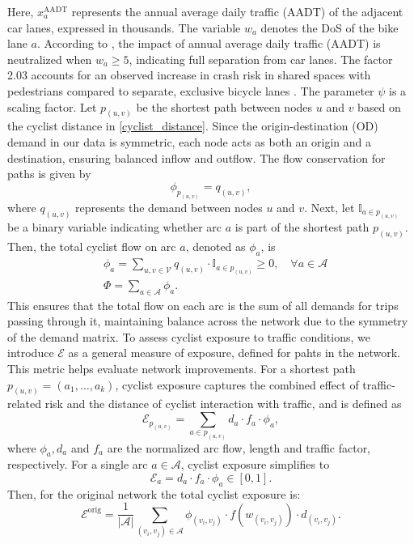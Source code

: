 \documentclass[lettersize,journal]{IEEEtran}
\begin{document}
Here, $x^{\text{AADT}}_{a}$ represents the annual average daily traffic (AADT) of the adjacent car lanes, expressed in thousands. The variable $w_a$ denotes the DoS of the bike lane $a$. According to \cite{cyclerap2024}, the impact of annual average daily traffic (AADT) is neutralized when $w_a \geq 5$, indicating full separation from car lanes. The factor 2.03 accounts for an observed increase in crash risk in shared spaces with pedestrians compared to separate, exclusive bicycle lanes \cite{mesimaki2021near}. The parameter $\psi$ is a scaling factor.  
Let $p_{(u,v)}$ be the shortest path between nodes $u$ and $v$ based on the cyclist distance in \eqref{cyclist_distance}. Since the origin-destination (OD) demand in our data is symmetric, each node acts as both an origin and a destination, ensuring balanced inflow and outflow. The flow conservation for paths is given by
\begin{equation}
\label{eq_shortest_path}
    \phi_{p_{(u,v)}} = q_{(u,v)},
\end{equation}
where $q_{(u,v)}$ represents the demand between nodes $u$ and $v$.  
Next, let $\mathbb{I}_{a \in p_{(u,v)}}$ be a binary variable indicating whether arc $a$ is part of the shortest path $p_{(u,v)}$. Then, the total cyclist flow on arc $a$, denoted as $\phi_a$, is
\begin{equation}
\begin{aligned}
\label{eq_flows}
  & \phi_{a}  = \sum_{u,v \in \mathcal{V}} q_{(u,v)} \cdot \mathbb{I}_{a \in p_{(u,v)}} \geq 0, \quad \forall a \in \mathcal{A}  \\
  & \Phi  = \sum_{a \in \mathcal{A}} \phi_{a}.
\end{aligned}
\end{equation}
This ensures that the total flow on each arc is the sum of all demands for trips passing through it, maintaining balance across the network due to the symmetry of the demand matrix. To assess cyclist exposure to traffic conditions, we introduce $\mathcal{E}$ as a general measure of exposure, defined for pahts in the network. This metric helps evaluate network improvements. For a shortest path $p_{(u,v)} = (a_1, \dots, a_k)$, cyclist exposure captures the combined effect of traffic-related risk and the distance of cyclist interaction with traffic, and is defined as
\begin{equation}
\label{exposure_def}
    \mathcal{E}_{p_{(u,v)}} = \sum_{a \in p_{(u,v)}} d_{a} \cdot f_{a} \cdot \phi_{a},
\end{equation}
where $\phi_{a}, d_{a}$ and $f_{a}$ are the normalized arc flow, length and traffic factor, respectively. For a single arc $a \in \mathcal{A}$, cyclist exposure simplifies to
\begin{equation}
\label{arc_exposure}
    \mathcal{E}_{a} = d_{a} \cdot f_{a} \cdot \phi_{a} \in  \left [ 0,1 \right ].
\end{equation}
Then, for the original network the total cyclist exposure is:
\begin{equation}
    \mathcal{E}^{\text{orig}} = \frac{1}{|\mathcal{A}|} \sum_{(v_{i},v_{j}) \in \mathcal{A}} \phi_{(v_{i},v_{j})} \cdot f(w_{(v_{i},v_{j})}) \cdot d_{(v_{i},v_{j})}.
\end{equation}
\end{document}
